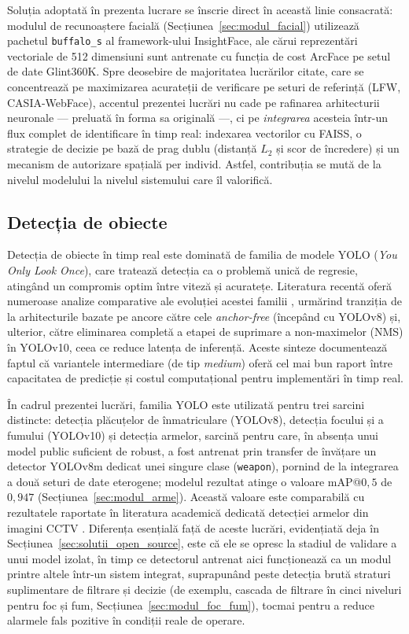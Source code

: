 \documentclass[../../main.tex]{subfiles}
\begin{document}
Soluția adoptată în prezenta lucrare se înscrie direct în această linie consacrată: modulul de recunoaștere facială (Secțiunea~\ref{sec:modul_facial}) utilizează pachetul \texttt{buffalo\_s} al framework-ului InsightFace, ale cărui reprezentări vectoriale de 512 dimensiuni sunt antrenate cu funcția de cost ArcFace pe setul de date Glint360K. Spre deosebire de majoritatea lucrărilor citate, care se concentrează pe maximizarea acurateții de verificare pe seturi de referință (LFW, CASIA-WebFace), accentul prezentei lucrări nu cade pe rafinarea arhitecturii neuronale --- preluată în forma sa originală ---, ci pe \emph{integrarea} acesteia într-un flux complet de identificare în timp real: indexarea vectorilor cu FAISS, o strategie de decizie pe bază de prag dublu (distanță $L_2$ și scor de încredere) și un mecanism de autorizare spațială per individ. Astfel, contribuția se mută de la nivelul modelului la nivelul sistemului care îl valorifică.

\subsection{Detecția de obiecte}
\label{subsec:cercetare_detectie}

Detecția de obiecte în timp real este dominată de familia de modele YOLO (\emph{You Only Look Once}), care tratează detecția ca o problemă unică de regresie, atingând un compromis optim între viteză și acuratețe. Literatura recentă oferă numeroase analize comparative ale evoluției acestei familii \cite{yolo_review2024, yolo_benchmark2024}, urmărind tranziția de la arhitecturile bazate pe ancore către cele \emph{anchor-free} (începând cu YOLOv8) și, ulterior, către eliminarea completă a etapei de suprimare a non-maximelor (NMS) în YOLOv10, ceea ce reduce latența de inferență. Aceste sinteze documentează faptul că variantele intermediare (de tip \emph{medium}) oferă cel mai bun raport între capacitatea de predicție și costul computațional pentru implementări în timp real.

În cadrul prezentei lucrări, familia YOLO este utilizată pentru trei sarcini distincte: detecția plăcuțelor de înmatriculare (YOLOv8), detecția focului și a fumului (YOLOv10) și detecția armelor, sarcină pentru care, în absența unui model public suficient de robust, a fost antrenat prin transfer de învățare un detector YOLOv8m dedicat unei singure clase (\texttt{weapon}), pornind de la integrarea a două seturi de date eterogene; modelul rezultat atinge o valoare mAP@$0{,}5$ de $0{,}947$ (Secțiunea~\ref{sec:modul_arme}). Această valoare este comparabilă cu rezultatele raportate în literatura academică dedicată detecției armelor din imagini CCTV \cite{fierro2026, mandal2026}. Diferența esențială față de aceste lucrări, evidențiată deja în Secțiunea~\ref{sec:solutii_open_source}, este că ele se opresc la stadiul de validare a unui model izolat, în timp ce detectorul antrenat aici funcționează ca un modul printre altele într-un sistem integrat, suprapunând peste detecția brută straturi suplimentare de filtrare și decizie (de exemplu, cascada de filtrare în cinci niveluri pentru foc și fum, Secțiunea~\ref{sec:modul_foc_fum}), tocmai pentru a reduce alarmele fals pozitive în condiții reale de operare.
\end{document}
